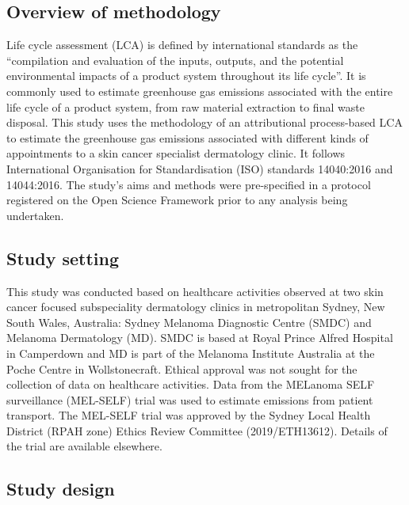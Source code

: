 \begin{refsection}
\subsection{Overview of methodology}

Life cycle assessment (LCA) is defined by international standards as the “compilation and evaluation of the inputs, outputs, and the potential environmental impacts of a product system throughout its life cycle”.\cite{international_organization_for_standardization_iso_2006} It is commonly used to estimate greenhouse gas emissions associated with the entire life cycle of a product system, from raw material extraction to final waste disposal. This study uses the methodology of an attributional process-based LCA to estimate the greenhouse gas emissions associated with different kinds of appointments to a skin cancer specialist dermatology clinic. It follows International Organisation for Standardisation (ISO) standards 14040:2016 and 14044:2016.\cite{international_organization_for_standardization_iso_2006, international_organization_for_standardization_iso_2006-1} The study’s aims and methods were pre-specified in a protocol registered on the Open Science Framework prior to any analysis being undertaken.\cite{williams_climate_2025}

\subsection{Study setting}

This study was conducted based on healthcare activities observed at two skin cancer focused subspeciality dermatology clinics in metropolitan Sydney, New South Wales, Australia: Sydney Melanoma Diagnostic Centre (SMDC) and Melanoma Dermatology (MD). SMDC is based at Royal Prince Alfred Hospital in Camperdown and MD is part of the Melanoma Institute Australia at the Poche Centre in Wollstonecraft. Ethical approval was not sought for the collection of data on healthcare activities. Data from the MELanoma SELF surveillance (MEL-SELF) trial was used to estimate emissions from patient transport. The MEL-SELF trial was approved by the Sydney Local Health District (RPAH zone) Ethics Review Committee (2019/ETH13612). Details of the trial are available elsewhere.\cite{ackermann_can_2021} 

\subsection{Study design}


\end{refsection}
